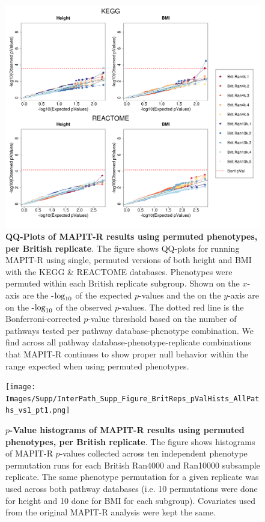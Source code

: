 \documentclass[10pt,a4paper]{article}
\def\log{{\rm log}}
\begin{document}
\begin{figure}[htbp]
\centering
\includegraphics[scale=.35]{Images/Supp/InterPath_Supp_Figure_BritReps_perm1_QQPlots_AllPaths_vs1.png}
\caption[TBD]{\textbf{QQ-Plots of MAPIT-R results using permuted phenotypes, per British replicate}. The figure shows QQ-plots for running MAPIT-R using single, permuted versions of both height and BMI with the KEGG \& REACTOME databases. Phenotypes were permuted within each British replicate subgroup. Shown on the $x$-axis are the -$\log_{10}$ of the expected $p$-values and the on the $y$-axis are on the -$\log_{10}$ of the observed $p$-values. The dotted red line is the Bonferroni-corrected $p$-value threshold based on the number of pathways tested per pathway database-phenotype combination. We find across all pathway database-phenotype-replicate combinations that MAPIT-R continues to show proper null behavior within the range expected when using permuted phenotypes.}
\label{InterPath-Supp-Figure-BritReps-perm1-QQPlots-AllPaths}
\end{figure}
\clearpage

\setlength{\footskip}{1cm}
\begin{figure}[htbp]
\centering
\vspace*{-1cm}
\texttt{[image: Images/Supp/InterPath\_Supp\_Figure\_BritReps\_pValHists\_AllPaths\_vs1\_pt1.png]}
\caption[TBD]{\textbf{$p$-Value histograms of MAPIT-R results using permuted phenotypes, per British replicate}. The figure shows histograms of MAPIT-R $p$-values collected across ten independent phenotype permutation runs for each British Ran4000 and Ran10000 subsample replicate. The same phenotype permutation for a given replicate was used across both pathway databases (i.e. 10 permutations were done for height and 10 done for BMI for each subgroup). Covariates used from the original MAPIT-R analysis were kept the same.}
\label{InterPath-Supp-Figure-BritReps-10perms-pValHists-pt1}
\end{figure}
\clearpage
\setlength{\footskip}{1cm}
\addtocounter{figure}{-1}
\end{document}
